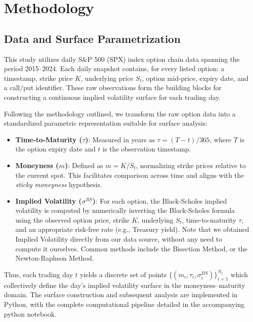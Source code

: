\documentclass[a4paper,12pt]{report}
\begin{document}
\chapter{Methodology}

\section{Data and Surface Parametrization}
\label{sec:data-parametrization}

This study utilizes daily S\&P 500 (SPX) index option chain data spanning the period 2015–2024. Each daily snapshot contains, for every listed option: a timestamp, strike price $K$, underlying price $S_t$, option mid-price, expiry date, and a call/put identifier. These raw observations form the building blocks for constructing a continuous implied volatility surface for each trading day.

Following the methodology outlined, we transform the raw option data into a standardized parametric representation suitable for surface analysis:

\begin{itemize}
    \item \textbf{Time-to-Maturity ($\tau$)}: Measured in years as $\tau = (T - t)/365$, where $T$ is the option expiry date and $t$ is the observation timestamp.
    \item \textbf{Moneyness ($m$)}: Defined as $m = K / S_t$, normalizing strike prices relative to the current spot. This facilitates comparison across time and aligns with the \textit{sticky moneyness} hypothesis.
    \item \textbf{Implied Volatility ($\sigma^{BS}$)}: For each option, the Black-Scholes implied volatility is computed by numerically inverting the Black-Scholes formula using the observed option price, strike $K$, underlying $S_t$, time-to-maturity $\tau$, and an appropriate risk-free rate (e.g., Treasury yield). Note that we obtained Implied Volatility directly from our data source, without any need to compute it ourselves. Common methods include the Bisection Method, or the Newton-Raphson Method. 
\end{itemize}

Thus, each trading day $t$ yields a discrete set of points $\{(m_i, \tau_i, \sigma^{BS}_i)\}_{i=1}^{N_t}$ which collectively define the day's implied volatility surface in the moneyness–maturity domain. The surface construction and subsequent analysis are implemented in Python, with the complete computational pipeline detailed in the accompanying python notebook.
\end{document}
